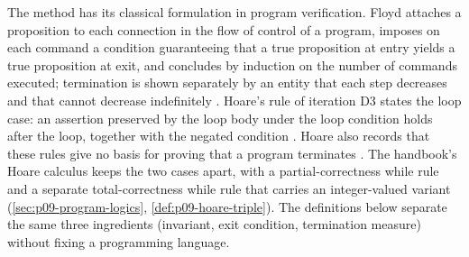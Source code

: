 The method has its classical formulation in program verification. Floyd
attaches a proposition to each connection in the flow of control of a
program, imposes on each command a condition guaranteeing that a true
proposition at entry yields a true proposition at exit, and concludes by
induction on the number of commands executed; termination is shown
separately by an entity that each step decreases and that cannot decrease
indefinitely \cite[p.~19]{Floyd1967}. Hoare's rule of iteration D3 states the
loop case: an assertion preserved by the loop body under the loop condition
holds after the loop, together with the negated condition
\cite[p.~578, \S\,3.4]{Hoare1969}. Hoare also records that these rules give
no basis for proving that a program terminates
\cite[p.~579, \S\,4]{Hoare1969}. The handbook's Hoare calculus keeps the two
cases apart, with a partial-correctness while rule and a separate
total-correctness while rule that carries an integer-valued variant
(\cref{sec:p09-program-logics}, \cref{def:p09-hoare-triple}).
The definitions below separate the same three ingredients (invariant, exit
condition, termination measure) without fixing a programming language.

